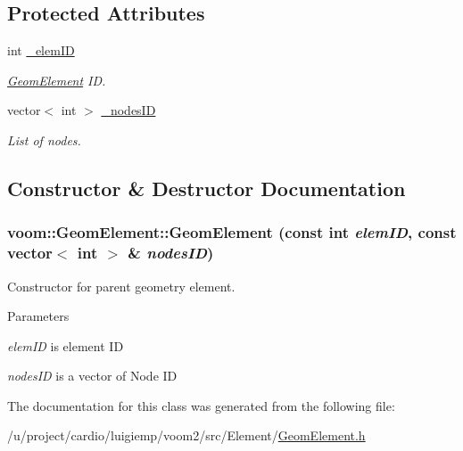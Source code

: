 \subsection*{Protected Attributes}
\begin{DoxyCompactItemize}
\item 
\hypertarget{classvoom_1_1_geom_element_abe25de7b2864b04f7979c1bc179bd611}{
int \hyperlink{classvoom_1_1_geom_element_abe25de7b2864b04f7979c1bc179bd611}{\_\-elemID}}
\label{classvoom_1_1_geom_element_abe25de7b2864b04f7979c1bc179bd611}

\begin{DoxyCompactList}\small\item\em \hyperlink{classvoom_1_1_geom_element}{GeomElement} ID. \item\end{DoxyCompactList}\item 
\hypertarget{classvoom_1_1_geom_element_ac45cc5a468feaca2d0a651bfe3def0b5}{
vector$<$ int $>$ \hyperlink{classvoom_1_1_geom_element_ac45cc5a468feaca2d0a651bfe3def0b5}{\_\-nodesID}}
\label{classvoom_1_1_geom_element_ac45cc5a468feaca2d0a651bfe3def0b5}

\begin{DoxyCompactList}\small\item\em List of nodes. \item\end{DoxyCompactList}\end{DoxyCompactItemize}


\subsection{Constructor \& Destructor Documentation}
\hypertarget{classvoom_1_1_geom_element_a81373f05c7c57bf7f525766d6b6f679b}{
\subsubsection[{GeomElement}]{\setlength{\rightskip}{0pt plus 5cm}voom::GeomElement::GeomElement (const int {\em elemID}, \/  const vector$<$ int $>$ \& {\em nodesID})}}
\label{classvoom_1_1_geom_element_a81373f05c7c57bf7f525766d6b6f679b}
Constructor for parent geometry element. 
\begin{DoxyParams}{Parameters}
\item[{\em elemID}]is element ID \item[{\em nodesID}]is a vector of Node ID \end{DoxyParams}


The documentation for this class was generated from the following file:\begin{DoxyCompactItemize}
\item 
/u/project/cardio/luigiemp/voom2/src/Element/\hyperlink{_geom_element_8h}{GeomElement.h}\end{DoxyCompactItemize}
